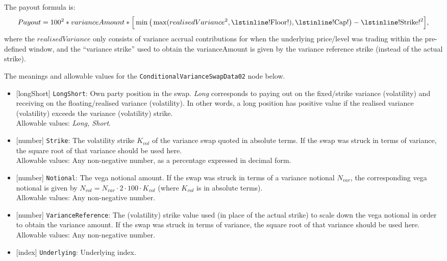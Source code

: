 The payout formula is:
\begin{equation*}
  Payout = 100^2 * varianceAmount * \Big[ \min \big( \max (realisedVariance^2, \text{\lstinline!Floor!}), \text{\lstinline!Cap!}\big) - \text{\lstinline!Strike!}^2 \Big],
\end{equation*}
where the $realisedVariance$ only consists of variance accrual contributions for when the underlying price/level
was trading within the pre-defined window, and the ``variance strike'' used to obtain the varianceAmount is 
given by the variance reference strike (instead of the actual strike).

The meanings and allowable values for the \lstinline!ConditionalVarianceSwapData02! node below.

\begin{itemize}
  \item{}[longShort] \lstinline!LongShort!: Own party position in the swap. \emph{Long} corresponds to paying out on the
  fixed/strike variance (volatility) and receiving on the floating/realised variance (volatility). In other words,
  a long position has positive value if the realised variance (volatility) exceeds the variance (volatility)
  strike. \\
  Allowable values: \emph{Long, Short}.
  \item{}[number] \lstinline!Strike!: The volatility strike $K_{vol}$ of the variance swap quoted in absolute terms.
  If the swap was struck in terms of variance, the square root of that variance should be used here. \\
  Allowable values: Any non-negative number, as a percentage expressed in decimal form.
  \item{}[number] \lstinline!Notional!: The vega notional amount. If the swap was struck in terms of a variance notional
  $N_{var}$, the corresponding vega notional is given by $N_{vol} = N_{var} \cdot 2 \cdot 100 \cdot K_{vol}$ (where
  $K_{vol}$ is in absolute terms). \\
  Allowable values: Any non-negative number.
  \item{}[number] \lstinline!VarianceReference!: The (volatility) strike value used (in place of the actual strike) to scale down the
  vega notional in order to obtain the variance amount. If the swap was struck in terms of variance, the square root of that
  variance should be used here. \\
  Allowable values: Any non-negative number.
  \item{}[index] \lstinline!Underlying!: Underlying index. \\

\end{itemize}
